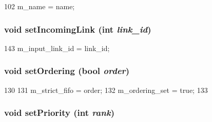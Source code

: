 \begin{DoxyCode}
102 { m_name = name; }
\end{DoxyCode}
\hypertarget{classMessageBuffer_aee0eb866227b5e46be9a2c51c22bcb88}{
\subsubsection[{setIncomingLink}]{\setlength{\rightskip}{0pt plus 5cm}void setIncomingLink (int {\em link\_\-id})}}
\label{classMessageBuffer_aee0eb866227b5e46be9a2c51c22bcb88}



\begin{DoxyCode}
143 { m_input_link_id = link_id; }
\end{DoxyCode}
\hypertarget{classMessageBuffer_ae93cbe20820d1830a52fceed6a4407dc}{
\subsubsection[{setOrdering}]{\setlength{\rightskip}{0pt plus 5cm}void setOrdering (bool {\em order})}}
\label{classMessageBuffer_ae93cbe20820d1830a52fceed6a4407dc}



\begin{DoxyCode}
130     {
131         m_strict_fifo = order;
132         m_ordering_set = true;
133     }
\end{DoxyCode}
\hypertarget{classMessageBuffer_a6f56c404ece2826d0b11ad759fdf0fb4}{
\subsubsection[{setPriority}]{\setlength{\rightskip}{0pt plus 5cm}void setPriority (int {\em rank})}}
\label{classMessageBuffer_a6f56c404ece2826d0b11ad759fdf0fb4}



